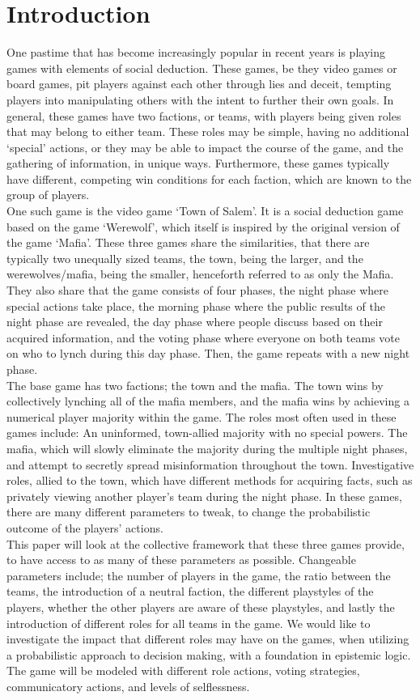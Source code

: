 \section{Introduction}
One pastime that has become increasingly popular in recent years is playing
games with elements of social deduction. These games, be they video games or
board games, pit players against each other through lies and deceit, tempting
players into manipulating others with the intent to further their own goals. In
general, these games have two factions, or teams, with players being given
roles that may belong to either team. These roles may be simple, having no
additional ‘special’ actions, or they may be able to impact the course of the
game, and the gathering of information, in unique ways. Furthermore, these
games typically have different, competing win conditions for each faction,
which are known to the group of players. \\ One such game is the video game ‘Town
of Salem’. It is a social deduction game based on the game ‘Werewolf’, which
itself is inspired by the original version of the game ‘Mafia’. These three
games share the similarities, that there are typically two unequally sized
teams, the town, being the larger, and the werewolves/mafia, being the smaller,
henceforth referred to as only the Mafia. They also share that the game
consists of four phases, the night phase where special actions take place, the
morning phase where the public results of the night phase are revealed, the day
phase where people discuss based on their acquired information, and the voting
phase where everyone on both teams vote on who to lynch during this day phase.
Then, the game repeats with a new night phase. \\ The base game has two factions;
the town and the mafia. The town wins by collectively lynching all of the mafia
members, and the mafia wins by achieving a numerical player majority within the
game. The roles most often used in these games include: An uninformed,
town-allied majority with no special powers. The mafia, which will slowly
eliminate the majority during the multiple night phases, and attempt to
secretly spread misinformation throughout the town. Investigative roles, allied
to the town, which have different methods for acquiring facts, such as
privately viewing another player’s team during the night phase. In these games,
there are many different parameters to tweak, to change the probabilistic
outcome of the players’ actions. \\ This paper will look at the collective
framework that these three games provide, to have access to as many of these
parameters as possible. Changeable parameters include; the number of players in
the game, the ratio between the teams, the introduction of a neutral faction,
the different playstyles of the players, whether the other players are aware of
these playstyles, and lastly the introduction of different roles for all teams
in the game. We would like to investigate the impact that different roles may
have on the games, when utilizing a probabilistic approach to decision making,
with a foundation in epistemic logic. The game will be modeled with different
role actions, voting strategies, communicatory actions, and levels of
selflessness.
